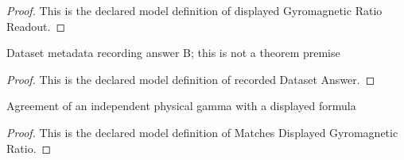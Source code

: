 \begin{proof}
  This is the declared model definition of displayed Gyromagnetic Ratio Readout.
\end{proof}
\begin{definition}
  \label{def:physics:phyx-mini-0970:phyxminiproblems-problemphyxmini0970-recordeddatasetanswer}
  Dataset metadata recording answer B; this is not a theorem premise
\end{definition}
\begin{proof}
  This is the declared model definition of recorded Dataset Answer.
\end{proof}
\begin{definition}
  \label{def:physics:phyx-mini-0970:phyxminiproblems-problemphyxmini0970-matchesdisplayedgyromagneticratio}
  Agreement of an independent physical gamma with a displayed formula
\end{definition}
\begin{proof}
  This is the declared model definition of Matches Displayed Gyromagnetic Ratio.
\end{proof}
